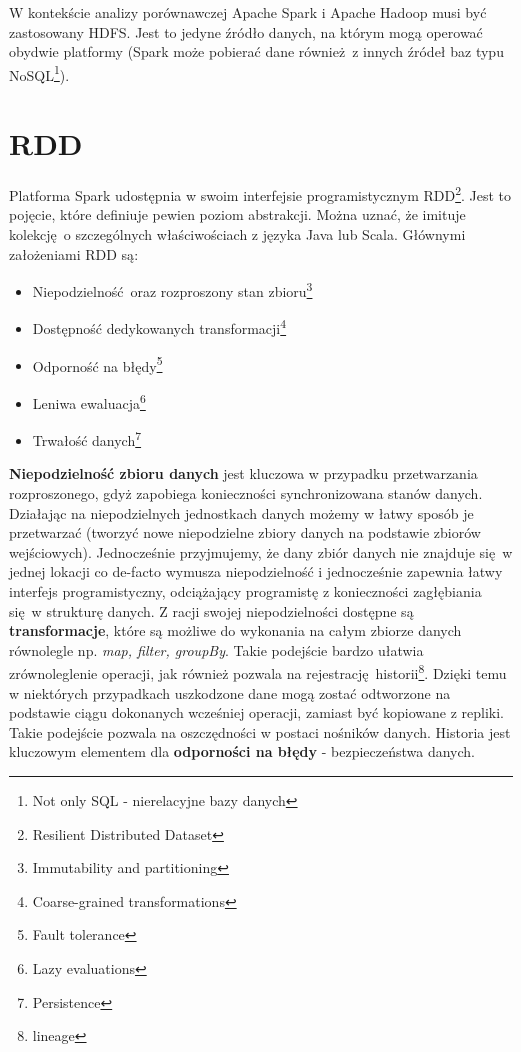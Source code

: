 \newline W kontekście analizy porównawczej Apache Spark i Apache Hadoop musi być zastosowany HDFS. Jest to jedyne źródło danych, na którym mogą operować obydwie platformy (Spark może pobierać dane również z innych źródeł baz typu NoSQL\footnote{Not only SQL - nierelacyjne bazy danych}).

\section{RDD}
Platforma Spark udostępnia w swoim interfejsie programistycznym RDD\footnote{Resilient Distributed Dataset}. Jest to pojęcie, które definiuje pewien poziom abstrakcji. Można uznać, że imituje kolekcję o szczególnych właściwościach z języka Java lub Scala. Głównymi założeniami RDD są\cite{Zaharia:2012:RDD:2228298.2228301}:
\begin{itemize}
	\item Niepodzielność oraz rozproszony stan zbioru\footnote{Immutability and partitioning}
	\item Dostępność dedykowanych transformacji\footnote{Coarse-grained transformations}
	\item Odporność na błędy\footnote{Fault tolerance}
	\item Leniwa ewaluacja\footnote{Lazy evaluations}
	\item Trwałość danych\footnote{Persistence}	
\end{itemize}
\textbf{Niepodzielność zbioru danych} jest kluczowa w przypadku przetwarzania rozproszonego, gdyż zapobiega konieczności synchronizowana stanów danych. Działając na niepodzielnych jednostkach danych możemy w łatwy sposób je przetwarzać (tworzyć nowe niepodzielne zbiory danych na podstawie zbiorów wejściowych). Jednocześnie przyjmujemy, że dany zbiór danych nie znajduje się w jednej lokacji co de-facto wymusza niepodzielność i jednocześnie zapewnia łatwy interfejs programistyczny, odciążający programistę z konieczności zagłębiania się w strukturę danych. 
\newline Z racji swojej niepodzielności dostępne są \textbf{transformacje}, które są możliwe do wykonania na całym zbiorze danych równolegle np. \textit{map, filter, groupBy}. Takie podejście bardzo ułatwia zrównoleglenie operacji, jak również pozwala na rejestrację historii\footnote{lineage}. Dzięki temu w niektórych przypadkach uszkodzone dane mogą zostać odtworzone na podstawie ciągu dokonanych wcześniej operacji, zamiast być kopiowane z repliki. Takie podejście pozwala na oszczędności w postaci nośników danych. Historia jest kluczowym elementem dla \textbf{odporności na błędy} - bezpieczeństwa danych.
